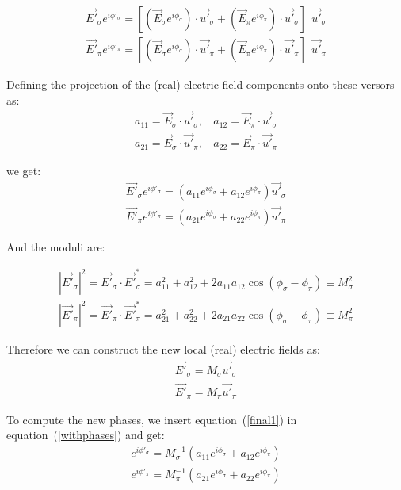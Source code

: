 \documentclass{iucr}
\begin{document}
\begin{eqnarray}
\vec{E'}_\sigma e^{i \phi'_\sigma} = [(\vec{E}_\sigma e^{i \phi_\sigma})\cdot\vec{u'}_\sigma + (\vec{E}_\pi e^{i \phi_\pi})\cdot\vec{u'}_\sigma ] 
  ~~\vec{u'}_\sigma  \\ 
\vec{E'}_\pi e^{i \phi'_\pi} = [(\vec{E}_\sigma e^{i \phi_\sigma})\cdot\vec{u'}_\pi + (\vec{E}_\pi e^{i \phi_\pi})\cdot\vec{u'}_\pi ] 
  ~~\vec{u'}_\pi 
\end{eqnarray}


Defining the projection of the (real) electric field components onto these versors as: 
\begin{eqnarray}
a_{11} = \vec{E}_\sigma \cdot \vec{u'}_\sigma, ~~~~ 
a_{12} = \vec{E}_\pi \cdot \vec{u'}_\sigma \nonumber \\
a_{21} = \vec{E}_\sigma \cdot \vec{u'}_\pi, ~~~~
a_{22} = \vec{E}_\pi \cdot \vec{u'}_\pi 
\end{eqnarray}

we get:
\begin{eqnarray}
\label{withphases}
\vec{E'}_\sigma e^{i \phi'_\sigma} = (a_{11} e^{i \phi_\sigma} + a_{12} e^{i \phi_\pi}) \vec{u'}_\sigma \nonumber \\ 
\vec{E'}_\pi e^{i \phi'_\pi} =    (a_{21} e^{i \phi_\sigma} + a_{22} e^{i \phi_\pi}) \vec{u'}_\pi
\end{eqnarray}

And the moduli are: 

\begin{eqnarray}
|\vec{E'}_\sigma|^2 = \vec{E'}_\sigma \cdot \vec{E'}_\sigma^*  = 
a_{11}^2 + a_{12}^2 + 2 a_{11} a_{12} \cos(\phi_\sigma-\phi_\pi) \equiv
M_\sigma^2 \nonumber \\ 
|\vec{E'}_\pi|^2    = \vec{E'}_\pi \cdot \vec{E'}_\pi^*     = 
a_{21}^2 + a_{22}^2 + 2 a_{21} a_{22} \cos(\phi_\sigma-\phi_\pi) \equiv
M_\pi^2
\end{eqnarray}

Therefore we can construct the new local (real) electric fields as: 
\begin{eqnarray}
\label{final1}
\vec{E'}_\sigma = M_\sigma \vec{u'}_\sigma  \nonumber \\ 
\vec{E'}_\pi = M_\pi \vec{u'}_\pi  
\end{eqnarray}

To compute the new phases, we insert equation~(\ref{final1}) in equation~(\ref{withphases}) and get: 
\begin{eqnarray}
e^{i \phi'_\sigma} = M_\sigma^{-1} (a_{11} e^{i \phi_\sigma} + a_{12} e^{i \phi_\pi})  \nonumber \\ 
e^{i \phi'_\pi} =  M_\pi^{-1}      (a_{21} e^{i \phi_\sigma} + a_{22} e^{i \phi_\pi}) 
\end{eqnarray}
\end{document}

